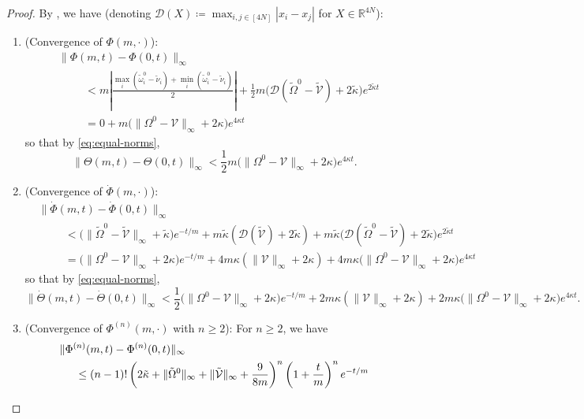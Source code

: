\documentclass[11pt,reqno]{amsart}
\theoremstyle{definition}
\theoremstyle{remark}
\begin{document}
\begin{proof}
	By \cite[Proposition 3.2]{cho2025inertia}, we have (denoting $\mathcal{D}(X)\coloneqq \max_{i,j\in [4N]}|x_i-x_j|$ for $X\in \mathbb{R}^{4N}$):
\begin{enumerate}
	\item (Convergence of $\Phi(m, \cdot)$):
	\begin{align*}
			& \|\Phi(m,t)-\Phi(0,t)\|_\infty \\
			&\hspace{1cm} < m\left|\frac{\max_i(\tilde{\omega}_i^0-\tilde{\nu}_i)+\min_i(\tilde{\omega}_i^0-\tilde{\nu}_i)}2\right|  +\frac 12 m \Big(\mathcal{D} (\tilde{\Omega}^0-\tilde{\mathcal{V}})+2\tilde{\kappa} \Big )e^{2\tilde{\kappa} t}\\
			&\hspace{1cm}=0+m \Big(\|\Omega^0-\mathcal{V}\|_\infty+2\kappa \Big )e^{4\kappa t}
	\end{align*}
	so that by \eqref{eq:equal-norms},
	\[
	\|\Theta(m,t)-\Theta(0,t)\|_\infty < \frac 12 m \Big(\|\Omega^0-\mathcal{V}\|_\infty+2\kappa \Big )e^{4\kappa t}.
	\]
	\item 
	(Convergence of ${\dot \Phi}(m, \cdot)$):
	\begin{align*}
			&\|\dot\Phi(m,t)-\dot\Phi(0,t)\|_\infty \\
			&\hspace{1cm} < \Big(\|\tilde{\Omega}^0-\tilde{\mathcal{V}}\|_\infty+\tilde{\kappa} \Big)e^{-t/m}+ m\tilde{\kappa}(\mathcal{D}(\tilde{\mathcal{V}})+2\tilde{\kappa}) +m\tilde{\kappa} \Big (\mathcal{D}(\tilde{\Omega}^0-\tilde{\mathcal{V}})+2\tilde{\kappa} \Big )e^{2\tilde{\kappa} t}\\
			&\hspace{1cm} =\Big(\|\Omega^0-\mathcal{V}\|_\infty+2\kappa \Big)e^{-t/m}+ 4m\kappa(\|\mathcal{V}\|_\infty+2\kappa) +4m\kappa \Big (\|\Omega^0-\mathcal{V}\|_\infty+2\kappa\Big )e^{4\kappa t}
	\end{align*}
	so that by \eqref{eq:equal-norms},
	\[
	\|\dot\Theta(m,t)-\dot\Theta(0,t)\|_\infty<\frac 12\Big(\|\Omega^0-\mathcal{V}\|_\infty+2\kappa \Big)e^{-t/m}+ 2m\kappa(\|\mathcal{V}\|_\infty+2\kappa) +2m\kappa \Big (\|\Omega^0-\mathcal{V}\|_\infty+2\kappa\Big )e^{4\kappa t}.
	\]
	\item (Convergence of $\Phi^{(n)}(m, \cdot)$ with $n \geq 2$):
	For $n\ge 2$, we have
	\begin{align*}
		&\|\Phi^{(n)}(m,t)-\Phi^{(n)}(0,t)\|_\infty\\
		& \hspace{0.5cm} \le (n-1)!\left(2\tilde{\kappa}+\|\tilde{\Omega}^0\|_\infty+\|\tilde{\mathcal{V}}\|_\infty+\frac{9}{8m}\right)^{n}\left(1+\frac tm\right)^{n}e^{-t/m}\\

\end{align*}
\end{enumerate}
\end{proof}
\end{document}
